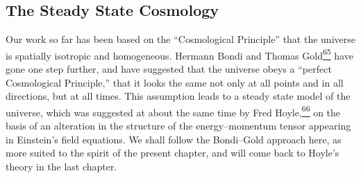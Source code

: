 %

\subsection{The Steady State Cosmology}\label{sec:14.8}

Our work so far has been based on the ``Cosmological Principle'' that the
universe is spatially isotropic and homogeneous. Hermann Bondi and Thomas
Gold\hyperref[ch14-ref-65]{\textsuperscript{65}} have gone one step further,
and have suggested that the universe obeys a ``perfect Cosmological
Principle,'' that it looks the same not only at all points and in all
directions, but at all times. This assumption leads to a steady state model
of the universe, which was suggested at about the same time by Fred
Hoyle,\hyperref[ch14-ref-66]{\textsuperscript{66}} on the basis of an
alteration in the structure of the energy--momentum tensor appearing in
Einstein's field equations. We shall follow the Bondi--Gold approach here,
as more suited to the spirit of the present chapter, and will come back to
Hoyle's theory in the last chapter.

